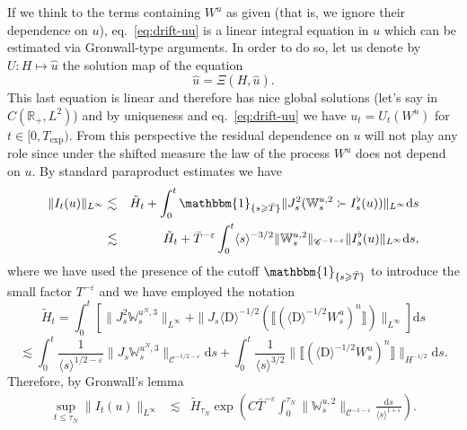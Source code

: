 \documentclass[11pt]{article}
\newcommand{\mathD}{\mathrm{D}}
\newcommand{\mathd}{\mathrm{d}}
\newcommand{\VV}{\mathscr{C}}
\begin{document}
If we think to the terms containing $W^u$ as given (that is, we ignore their
dependence on $u$), eq.~{\eqref{eq:drift-uu}} is a linear integral equation in
$u$ which can be estimated via Gronwall-type arguments. In order to do so, let
us denote by $U : H \mapsto \hat{u}$ the solution map of the equation
\begin{equation}
  \hat{u} = \Xi (H, \hat{u}) . \label{eq:map-U}
\end{equation}
This last equation is linear and therefore has nice global solutions (let's
say in $C (\mathbb{R}_+, L^2)$) and by uniqueness and
eq.~{\eqref{eq:drift-uu}} we have $u_t = U_t (W^u)$ for $t \in [0, T_{\exp})$.
From this perspective the residual dependence on $u$ will not play any role
since under the shifted measure the law of the process $W^u$ does not depend
on $u$. By standard paraproduct estimates we have
\begin{eqnarray*}
  \| I_t (u) \|_{L^{\infty}} & \lesssim & \tilde{H}_t + \int^t_0
  \mathbbm{1}_{\{ s \geqslant \bar{T} \}} \| J^2_s (\mathbb{W}_s^{u, 2} \succ
  I_s^{\flat} (u)) \|_{L^{\infty}} \mathd s\\
  & \lesssim & \tilde{H}_t + \bar{T}^{- \varepsilon} \int^t_0 \langle s
  \rangle^{- 3 / 2} \| \mathbb{W}_s^{u, 2} \|_{\VV^{- 1 - \varepsilon}} \|
  I_s^{\flat} (u) \|_{L^{\infty}} \mathd s,
\end{eqnarray*}
where we have used the presence of the cutoff $\mathbbm{1}_{\{ s \geqslant
\bar{T} \}}$ to introduce the small factor $T^{- \varepsilon}$ and we have
employed the notation
\[ \tilde{H}_t = \int^t_0 [\|J^2_s \mathbb{W}^{u^N, 3}_s \|_{L^{\infty}} +
   \| J_s \langle \mathD \rangle^{- 1 / 2} (\llbracket (\langle \mathD
   \rangle^{- 1 / 2} W^u_s)^n \rrbracket) \|_{L^{\infty}}] \mathd s \]
\[ \lesssim \int^t_0 \frac{1}{\langle s \rangle^{1 / 2 - \varepsilon}} \|J_s
   \mathbb{W}^{u^N, 3}_s \|_{\VV^{- 1 / 2 - \varepsilon}} \mathd s +
   \int^t_0 \frac{1}{\langle s \rangle^{3 / 2}} \| \llbracket (\langle \mathD
   \rangle^{- 1 / 2} W^u_s)^n \rrbracket \|_{H^{- 1 / 2}} \mathd s. \]
Therefore, by Gronwall's lemma
\begin{equation}
  \begin{array}{lll}
    \sup_{t \leqslant \tau_N} \| I_t (u) \|_{L^{\infty}} & \lesssim &
    \tilde{H}_{\tau_N} \exp \left( C \bar{T}^{- \varepsilon} \int^{\tau_N}_0
    \|\mathbb{W}_s^{u, 2} \|_{\VV^{- 1 - \varepsilon}} \frac{\mathd s}{\langle
    s \rangle^{1 + \varepsilon}} \right) .
  \end{array} \label{boundIu}
\end{equation}
\end{document}
